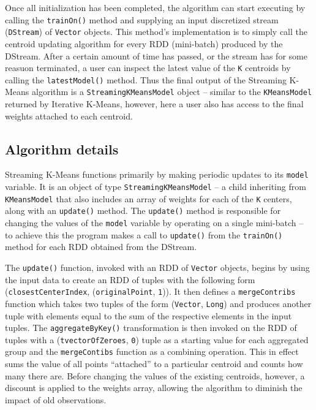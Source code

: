 \documentclass{l4proj}
\begin{document}
Once all initialization has been completed, the algorithm can start executing by calling the \texttt{trainOn()} method and supplying an input discretized stream (\texttt{DStream}) of \texttt{Vector} objects. This method's implementation is to simply call the centroid updating algorithm for every RDD (mini-batch) produced by the DStream. After a certain amount of time has passed, or the stream has for some reasuon terminated, a user can inspect the latest value of the \texttt{K} centroids by calling the \texttt{latestModel()} method. Thus the final output of the Streaming K-Means algorithm is a \texttt{StreamingKMeansModel} object -- similar to the \texttt{KMeansModel} returned by Iterative K-Means, however, here a user also has access to the final weights attached to each centroid.

\subsection{Algorithm details}

Streaming K-Means functions primarily by making periodic updates to its \texttt{model} variable. It is an object of type \texttt{StreamingKMeansModel} -- a child inheriting from \texttt{KMeansModel} that also includes an array of weights for each of the \texttt{K} centers, along with an \texttt{update()} method. The \texttt{update()} method is responsible for changing the values of the \texttt{model} variable by operating on a single mini-batch -- to achieve this the program makes a call to \texttt{update()} from the \texttt{trainOn()} method for each RDD obtained from the DStream.

The \texttt{update()} function, invoked with an RDD of \texttt{Vector} objects, begins by using the input data to create an RDD of tuples with the following form (\texttt{closestCenterIndex}, (\texttt{originalPoint}, \texttt{1})). It then defines a \texttt{mergeContribs} function which takes two tuples of the form (\texttt{Vector}, \texttt{Long}) and produces another tuple with elements equal to the sum of the respective elements in the input tuples. The \texttt{aggregateByKey()} transformation is then invoked on the RDD of tuples with a (\texttt{tvectorOfZeroes}, \texttt{0}) tuple as a starting value for each aggregated group and the \texttt{mergeContibs} function as a combining operation. This in effect sums the value of all points ``attached'' to a particular centroid and counts how many there are. Before changing the values of the existing centroids, however, a discount is applied to the weights array, allowing the algorithm to diminish the impact of old observations.
\end{document}

